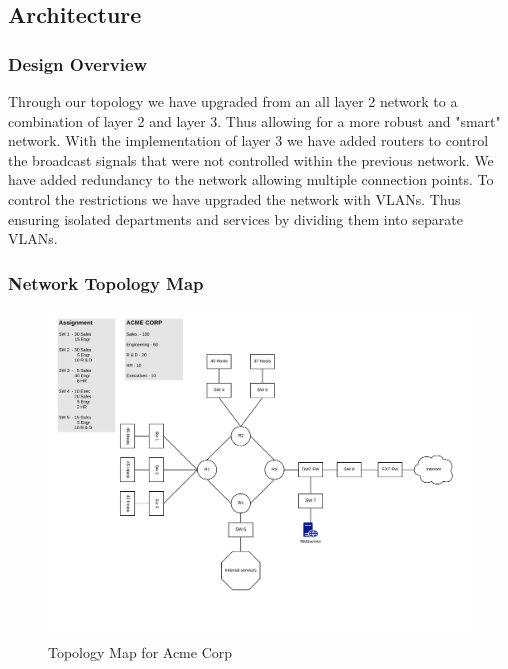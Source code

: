 \subsection{Architecture}
\subsubsection{Design Overview}
Through our topology we have upgraded from an all layer 2 network to a 
combination of layer 2 and layer 3. Thus allowing for a more robust and "smart" 
network. With the implementation of layer 3 we have added routers to control 
the broadcast signals that were not controlled within the previous network. We 
have added redundancy to the network allowing multiple connection points. To 
control the restrictions we have upgraded the network with VLANs. Thus ensuring 
isolated departments and services by dividing them into separate VLANs. 
 
\subsubsection{Network Topology Map}
\begin{figure}[!htb]
	\includegraphics[width=\textwidth]{images/networktopology.png}
	\caption{Topology Map for Acme Corp}
\end{figure}
